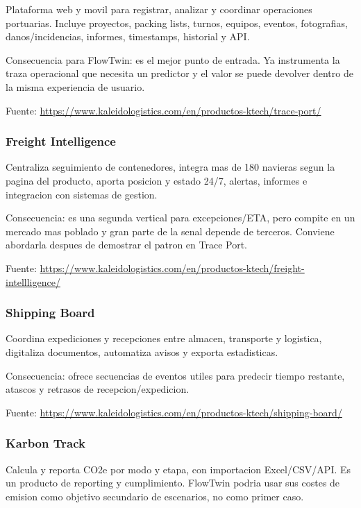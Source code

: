 \documentclass[
  spanish,
  10pt,
  a4paper,
]{article}
\begin{document}
Plataforma web y movil para registrar, analizar y coordinar operaciones
portuarias. Incluye proyectos, packing lists, turnos, equipos, eventos,
fotografias, danos/incidencias, informes, timestamps, historial y API.

Consecuencia para FlowTwin: es el mejor punto de entrada. Ya instrumenta
la traza operacional que necesita un predictor y el valor se puede
devolver dentro de la misma experiencia de usuario.

Fuente:
\url{https://www.kaleidologistics.com/en/productos-ktech/trace-port/}

\subsubsection{Freight Intelligence}\label{freight-intelligence}

Centraliza seguimiento de contenedores, integra mas de 180 navieras
segun la pagina del producto, aporta posicion y estado 24/7, alertas,
informes e integracion con sistemas de gestion.

Consecuencia: es una segunda vertical para excepciones/ETA, pero compite
en un mercado mas poblado y gran parte de la senal depende de terceros.
Conviene abordarla despues de demostrar el patron en Trace Port.

Fuente:
\url{https://www.kaleidologistics.com/en/productos-ktech/freight-intellligence/}

\subsubsection{Shipping Board}\label{shipping-board}

Coordina expediciones y recepciones entre almacen, transporte y
logistica, digitaliza documentos, automatiza avisos y exporta
estadisticas.

Consecuencia: ofrece secuencias de eventos utiles para predecir tiempo
restante, atascos y retrasos de recepcion/expedicion.

Fuente:
\url{https://www.kaleidologistics.com/en/productos-ktech/shipping-board/}

\subsubsection{Karbon Track}\label{karbon-track}

Calcula y reporta CO2e por modo y etapa, con importacion Excel/CSV/API.
Es un producto de reporting y cumplimiento. FlowTwin podria usar sus
costes de emision como objetivo secundario de escenarios, no como primer
caso.
\end{document}
